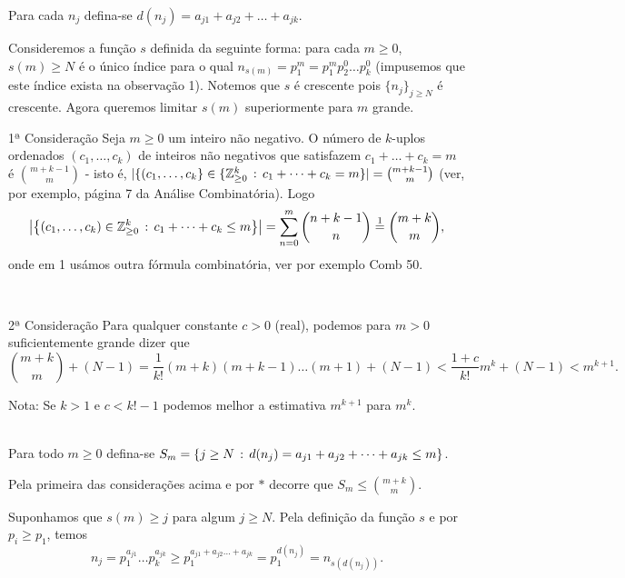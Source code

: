 \documentclass[repertorio-solutions-1.tex]{subfiles}
\newcommand*{\nj}{\ensuremath{\{n_j\}_{j\geq N}}}
\renewcommand*{\=}[1]{\ensuremath{\stackrel{\text{#1}}{=}}}
\begin{document}
\begin{solution}
Para cada $n_j$ defina-se $d(n_j)=a_{j1}+a_{j2}+\dots+a_{jk}$.

Consideremos a função $s$ definida da seguinte forma:
para cada $m\geq 0$, $s(m)\geq N$ é o único índice para o qual
$n_{s(m)}=p_1^m=p_1^mp_2^0\dots p_k^0$
(impusemos que este índice exista na observação 1).
Notemos que $s$ é crescente pois $\nj$ é crescente.
Agora queremos limitar $s(m)$ superiormente para $m$ grande.
\\

\begin{observation}{1ª Consideração}
Seja $m\geq 0$ um inteiro não negativo. O número de $k$-uplos ordenados
$(c_1,\dots,c_k)$ de inteiros não negativos que satisfazem
$c_1+\dots+c_k=m$ é $\binom{m+k-1}{m}$ - isto é,
$|\{(c_1,\dots,c_k\}\in\{\mathbb{Z}_{\geq 0}^k\,:\, c_1+\dots+c_k=m\}|
=\binom{m+k-1}{m}$
(ver, por exemplo, página 7 da Análise Combinatória).
Logo
\begin{equation*}
\left|\left\{(c_1,\dots,c_k)\in\mathbb{Z}_{\geq 0}^k\suchthat
c_1+\dots+c_k\leq m\right\}\right|
=\sum_{n=0}^m\binom{n+k-1}{n}\={1}\binom{m+k}{m},
\end{equation*}
onde em 1 usámos outra fórmula combinatória, ver por exemplo Comb 50.
\end{observation}
\\

\begin{observation}{2ª Consideração}
Para qualquer constante $c>0$ (real), podemos para $m>0$ suficientemente
grande dizer que
\begin{equation*}
\binom{m+k}{m}+(N-1)=\frac{1}{k!}(m+k)(m+k-1)\dots(m+1)+(N-1)
<\frac{1+c}{k!}m^k+(N-1)<m^{k+1}.
\end{equation*}
\begin{footnotesize}
Nota: Se $k>1$ e $c<k!-1$ podemos melhor a estimativa $m^{k+1}$ para $m^k$.
\end{footnotesize}
\end{observation}
\\

Para todo $m\geq 0$ defina-se
$S_m=\{j\geq N\,:\, d(n_j)=a_{j1}+a_{j2}+\dots+a_{jk}\leq m\}$.

Pela primeira das considerações acima e por $*$ decorre que
$S_m\leq\binom{m+k}{m}$.

Suponhamos que $s(m)\geq j$ para algum $j\geq N$.
Pela definição da função $s$ e por $p_i\geq p_1$, temos
\begin{equation*}
n_j=p_1^{a_{j1}}\dots p_k^{a_{jk}}
\geq p_1^{a_{j1}+a_{j2}\dots+a_{jk}}=p_1^{d(n_j)}=n_{s(d(n_j))}.
\end{equation*}


\end{solution}
\end{document}
